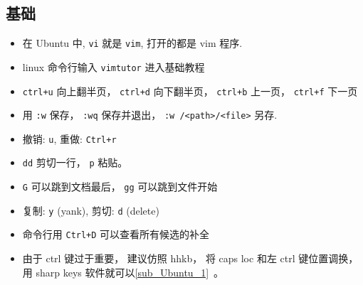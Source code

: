 
\begin{issues}
\issueDraft
\end{issues}

\subsection{基础}
\begin{itemize}
\item 在 Ubuntu 中, \verb`vi` 就是 \verb`vim`, 打开的都是 vim 程序.
\item linux 命令行输入 \verb`vimtutor` 进入基础教程
\item \verb`ctrl+u` 向上翻半页， \verb|ctrl+d| 向下翻半页， \verb|ctrl+b| 上一页， \verb|ctrl+f| 下一页
\item 用 \verb|:w| 保存， \verb|:wq| 保存并退出， \verb`:w /<path>/<file>` 另存.
\item 撤销: \verb`u`, 重做: \verb`Ctrl+r`
\item \verb`dd` 剪切一行， \verb|p| 粘贴。
\item \verb`G` 可以跳到文档最后， \verb`gg` 可以跳到文件开始
\item 复制: \verb`y` (yank), 剪切: \verb`d` (delete)
\item 命令行用 \verb`Ctrl+D` 可以查看所有候选的补全
\item 由于 ctrl 键过于重要， 建议仿照 hhkb， 将 caps loc 和左 ctrl 键位置调换， 用 sharp keys 软件就可以\autoref{sub_Ubuntu_1}~。
\end{itemize}

